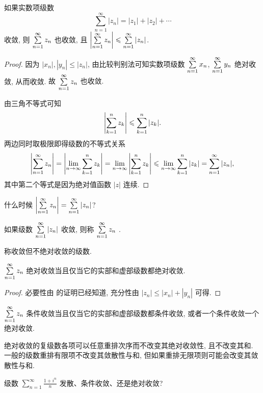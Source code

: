 \begin{theorem}\label{thm:absolute-convergent}
	如果实数项级数
	\[
		\sum_{n=1}^\infty|z_n|=|z_1|+|z_2|+\cdots
	\]
	收敛, 则 $\sum\limits_{n=1}^\infty z_n$ 也收敛, 且 $\left|\sum\limits_{n=1}^\infty z_n\right|\leqslant\sum\limits_{n=1}^\infty |z_n|$.
\end{theorem}

\begin{proof}
	因为 $|x_n|,|y_n|\le|z_n|$, 由比较判别法可知实数项级数 $\sum\limits_{n=1}^\infty x_n$, $\sum\limits_{n=1}^\infty y_n$ 绝对收敛, 从而收敛.
	{故 $\sum\limits_{n=1}^\infty z_n$ 也收敛.}

	由三角不等式可知
	\[
		\left|\sum_{k=1}^n z_k\right|\leqslant \sum_{k=1}^n|z_k|.
	\]
	两边同时取极限即得级数的不等式关系
	\[
		 \left|\sum_{n=1}^\infty z_n\right|
		=\left|\lim_{n\to\infty}\sum_{k=1}^n z_k\right|
		=\lim_{n\to\infty}\left|\sum_{k=1}^n z_k\right|
		\leqslant\lim_{n\to\infty}\sum_{k=1}^n|z_k|
		=\sum_{n=1}^\infty |z_n|,
	\]
	其中第二个等式是因为绝对值函数 $|z|$ 连续.
\end{proof}

\begin{exercise}
	什么时候 $\left|\sum\limits_{n=1}^\infty z_n\right|=\sum\limits_{n=1}^\infty|z_n|$?
\end{exercise}

\begin{definition}
	\begin{enumpar}
		\item 如果级数 $\sum\limits_{n=1}^\infty |z_n|$ 收敛, 则称 $\sum\limits_{n=1}^\infty z_n$ .
		\item 称收敛但不绝对收敛的级数.
	\end{enumpar}
\end{definition}

\begin{theorem}
	$\sum\limits_{n=1}^\infty z_n$ 绝对收敛当且仅当它的实部和虚部级数都绝对收敛.
\end{theorem}

\begin{proof}
	必要性由 的证明已经知道,
	充分性由 $|z_n|\le|x_n|+|y_n|$ 可得.
\end{proof}

$\sum\limits_{n=1}^\infty z_n$ 条件收敛当且仅当它的实部和虚部级数都条件收敛, 或者一个条件收敛一个绝对收敛.

绝对收敛的复级数各项可以任意重排次序而不改变其绝对收敛性, 且不改变其和.
一般的级数重排有限项不改变其敛散性与和, 但如果重排无限项则可能会改变其敛散性与和.

\begin{example}
	级数 $\displaystyle\sum_{n=1}^\infty\frac{1+i^n}n$ 发散、条件收敛、还是绝对收敛?
\end{example}

